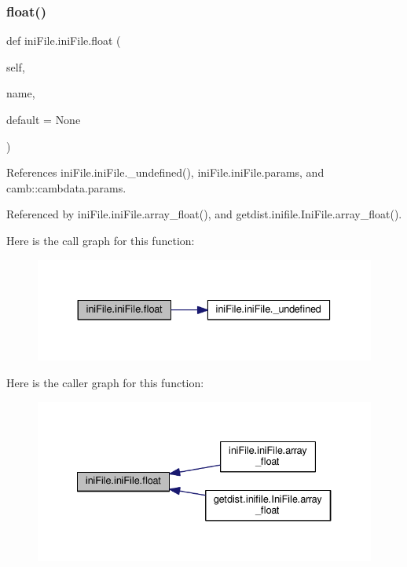 \subsubsection{\texorpdfstring{float()}{float()}}
{\footnotesize\ttfamily def ini\+File.\+ini\+File.\+float (\begin{DoxyParamCaption}\item[{}]{self,  }\item[{}]{name,  }\item[{}]{default = {\ttfamily None} }\end{DoxyParamCaption})}



References ini\+File.\+ini\+File.\+\_\+undefined(), ini\+File.\+ini\+File.\+params, and camb\+::cambdata.\+params.



Referenced by ini\+File.\+ini\+File.\+array\+\_\+float(), and getdist.\+inifile.\+Ini\+File.\+array\+\_\+float().

Here is the call graph for this function\+:
\nopagebreak
\begin{figure}[H]
\begin{center}
\leavevmode
\includegraphics[width=330pt]{classiniFile_1_1iniFile_ab471d92ca6e30f4df3b98f982a5656c6_cgraph}
\end{center}
\end{figure}
Here is the caller graph for this function\+:
\nopagebreak
\begin{figure}[H]
\begin{center}
\leavevmode
\includegraphics[width=334pt]{classiniFile_1_1iniFile_ab471d92ca6e30f4df3b98f982a5656c6_icgraph}
\end{center}
\end{figure}
\mbox{\label{classiniFile_1_1iniFile_ade7c382459479ea30036a227764b834f}} 
